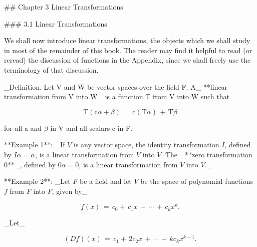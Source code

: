 

## Chapter 3 Linear Transformations

### 3.1 Linear Transformations

We shall now introduce linear transformations, the objects which we shall study in most of the remainder of this book. The reader may find it helpful to read (or reread) the discussion of functions in the Appendix, since we shall freely use the terminology of that discussion.

_Definition. Let V and W be vector spaces over the field F. A_ **linear transformation from V into W_ is a function T from V into W such that

\[\mbox{T}(\mbox{c}\alpha+\beta)\,=\,\mbox{c}(\mbox{T}\alpha)\,+\,\mbox{T}\beta\]

for all a and \(\beta\) in V and all scalars c in F.

**Example 1**: _If \(V\) is any vector space, the identity transformation \(I\), defined by \(I\alpha=\alpha\), is a linear transformation from \(V\) into \(V\). The_ **zero transformation 0**_, defined by \(0\alpha=0\), is a linear transformation from \(V\) into \(V\)._

**Example 2**: _Let \(F\) be a field and let \(V\) be the space of polynomial functions \(f\) from \(F\) into \(F\), given by_

\[f(x)\,=\,c_{0}+\,c_{1}x\,+\,\cdots\,+\,c_{k}x^{k}.\]

_Let_

\[(Df)(x)\,=\,c_{1}+\,2c_{2}x\,+\,\cdots\,+\,kc_{k}x^{k-1}.\]